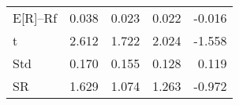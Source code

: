 \begin{tabular}{lrrrr}
\toprule
\midrule
E[R]--Rf & 0.038 & 0.023 & 0.022 & -0.016 \\
t & 2.612 & 1.722 & 2.024 & -1.558 \\
Std & 0.170 & 0.155 & 0.128 & 0.119 \\
SR & 1.629 & 1.074 & 1.263 & -0.972 \\
\bottomrule
\end{tabular}
